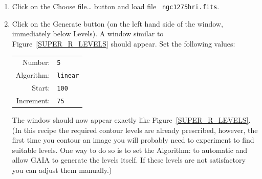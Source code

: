 \documentclass[twoside,11pt]{article}
\begin{document}
\begin{enumerate}
  \item Click on the {\sf Choose file\ldots} button and load file {\tt
   ngc1275hri.fits}.

  \item Click on the {\sf Generate} button (on the left hand side of the
   window, immediately below {\sf Levels}).  A window similar to
   Figure~\ref{SUPER_R_LEVELS} should appear.  Set the following values:

  \begin{center}
  \begin{tabular}{rl}
   {\sf Number:}    & {\tt 5} \\
   {\sf Algorithm:} & {\tt linear} \\
   {\sf Start:}     & {\tt 100} \\
   {\sf Increment:} & {\tt 75} \\
  \end{tabular}
  \end{center}

   The window should now appear exactly like Figure~\ref{SUPER_R_LEVELS}.
   (In this recipe the required contour levels are already prescribed,
   however, the first time you contour an image you will probably need
   to experiment to find suitable levels.  One way to do so is to set the
   {\sf Algorithm:} to {\sf automatic} and allow GAIA to generate the
   levels itself.  If these levels are not satisfactory you can adjust
   them manually.)


\end{enumerate}
\end{document}
